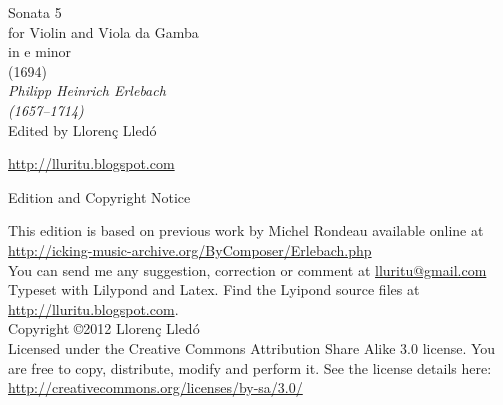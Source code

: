 \documentclass[a4paper]{article}
\begin{document}
{
\centering
\vspace*{0.08\textheight}
\fontsize{40}{50}\selectfont Sonata 5\\ for Violin and Viola da Gamba\\[0.5\baselineskip] 
\Huge in e minor  \\[0.5\baselineskip] (1694)\\[2\baselineskip]
{\huge \itshape Philipp Heinrich Erlebach \\(1657–1714)\\[4.4\baselineskip]}
\Large Edited by Llorenç Lledó\par
\vspace{0.02\textheight}
\url{http://lluritu.blogspot.com}
\\[\baselineskip]
}

\newpage
\pagestyle{empty}

\begin{center}
\huge Edition and Copyright Notice
\end{center}
\vspace{0.09\textheight}
\large
This edition is based on previous work by Michel Rondeau available online at  \url{http://icking-music-archive.org/ByComposer/Erlebach.php} \\[0.3cm]
You can send me any suggestion, correction or comment at \href{mailto:lluritu@gmail.com}{lluritu@gmail.com} \\[1.3cm]

Typeset with Lilypond and Latex. Find the Lyipond source files at \url{http://lluritu.blogspot.com}.\\[1.3cm]

Copyright \copyright 2012 Llorenç Lledó\\[0.3cm]
Licensed under the Creative Commons Attribution Share Alike 3.0 license.
You are free to copy, distribute, modify and perform it.
See the license details here:\\
\url{http://creativecommons.org/licenses/by-sa/3.0/}\\[1.3cm]
\end{document}
